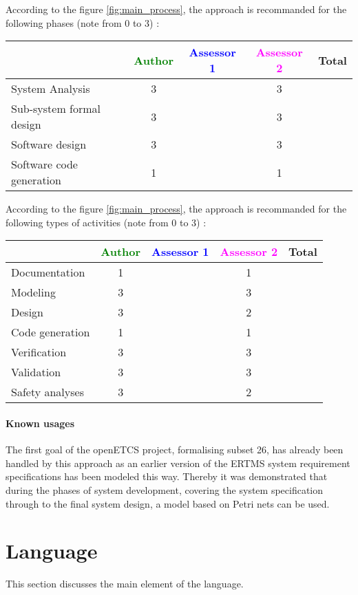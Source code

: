 According to the figure \ref{fig:main_process}, the approach is recommanded for the following phases (note from 0 to  3) :

\begin{tabular}{|l | c | c | c | c|}
\hline
& \textcolor{green}{Author} & \textcolor{blue}{Assessor 1} & \textcolor{magenta}{Assessor 2} & Total \\
\hline 
System Analysis & 3    & & 3    &  \\
\hline
Sub-system formal design & 3    & & 3    & \\
\hline
Software design & 3    & & 3    & \\
\hline
Software code generation & 1    & & 1    & \\
\hline
\end{tabular}

According to the figure \ref{fig:main_process}, the approach is recommanded for the following types of activities (note from 0 to  3) :

\begin{tabular}{|l | c | c | c | c|}
\hline
& \textcolor{green}{Author} & \textcolor{blue}{Assessor 1} & \textcolor{magenta}{Assessor 2} & Total \\
\hline 
Documentation & 1    & & 1    &  \\
\hline
Modeling & 3    & & 3    &  \\
\hline
Design & 3    & & 2    & \\
\hline
Code generation & 1    & & 1    & \\
\hline
Verification & 3    & & 3    & \\
\hline
Validation & 3    & & 3    & \\
\hline
Safety analyses & 3    & & 2    & \\
\hline
\end{tabular}

\paragraph{Known usages} 

The first goal of the openETCS project, formalising subset 26, has already been handled by this approach as  an earlier version of the ERTMS system requirement specifications has been modeled this way. Thereby it  was  demonstrated  that  during  the  phases  of  system development, covering the system specification through to the final system design, a  model based on Petri nets can be used.

\section{Language}
This section discusses the main element of the language.

